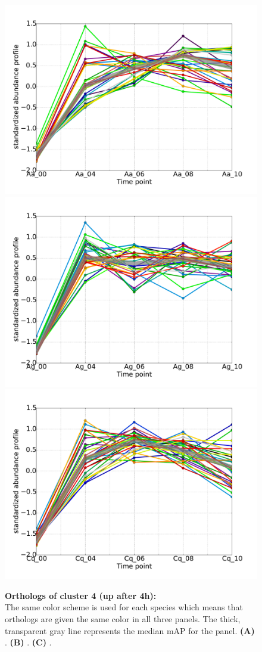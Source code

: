 \begin{figure}[hp]
% 
\subcaptionbox{\label{fig:cluster4-Aa}}
{\includegraphics[width=.5\linewidth]{figures/figs/ecr_and_insects_ptci_20130918_orthodb7/upAfter4_gene_profiles_from_cummerbund/Aa_upAfter4_cls4_Ag_target_FPKMs_vb_orthos.pdf}}
%
\subcaptionbox{\label{fig:cluster4-Ag}}
{\includegraphics[width=.5\linewidth]{figures/figs/ecr_and_insects_ptci_20130918_orthodb7/upAfter4_gene_profiles_from_cummerbund/Ag_upAfter4_cls4_Ag_target_FPKMs_vb_orthos.pdf}}
%
\subcaptionbox{\label{fig:cluster4-Cq}}
{\includegraphics[width=.5\linewidth]{figures/figs/ecr_and_insects_ptci_20130918_orthodb7/upAfter4_gene_profiles_from_cummerbund/Cq_upAfter4_cls4_Ag_target_FPKMs_vb_orthos.pdf}}
% 
\caption[Orthologs of cluster 4]{\sf \textbf{Orthologs of cluster 4 (up after 4h):}\\
The same color scheme is used for each species which means that orthologs are given the same color in all three panels.
The thick, transparent gray line represents the median \gls{mAP} for the panel.
\textbf{(A)} \Aa.
\textbf{(B)} \Ag.
\textbf{(C)} \Cq.
}\label{fig:cluster4}
\end{figure}
